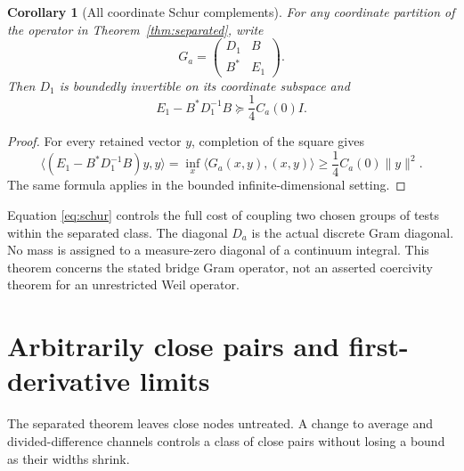\documentclass[11pt,letterpaper]{article}
\numberwithin{equation}{section}
\newtheorem{corollary}[theorem]{Corollary}
\theoremstyle{remark}\newtheorem{remark}[theorem]{Remark}
\begin{document}
\begin{corollary}[All coordinate Schur complements]\label{cor:schur}
For any coordinate partition of the operator in Theorem~\ref{thm:separated}, write
\[
G_a=\begin{pmatrix}D_1&B\\B^*&E_1\end{pmatrix}.
\]
Then $D_1$ is boundedly invertible on its coordinate subspace and
\begin{equation}\label{eq:schur}
\boxed{E_1-B^*D_1^{-1}B\succeq\frac14C_a(0)I.}
\end{equation}
\end{corollary}
\begin{proof}
For every retained vector $y$, completion of the square gives
\[
\langle(E_1-B^*D_1^{-1}B)y,y\rangle
=\inf_x\langle G_a(x,y),(x,y)\rangle
\ge\frac14C_a(0)\|y\|^2.
\]
The same formula applies in the bounded infinite-dimensional setting.
\end{proof}

Equation \eqref{eq:schur} controls the full cost of coupling two chosen groups of tests within the separated class. The diagonal $D_a$ is the actual discrete Gram diagonal. No mass is assigned to a measure-zero diagonal of a continuum integral. This theorem concerns the stated bridge Gram operator, not an asserted coercivity theorem for an unrestricted Weil operator.

\section{Arbitrarily close pairs and first-derivative limits}
The separated theorem leaves close nodes untreated. A change to average and divided-difference channels controls a class of close pairs without losing a bound as their widths shrink.
\end{document}
